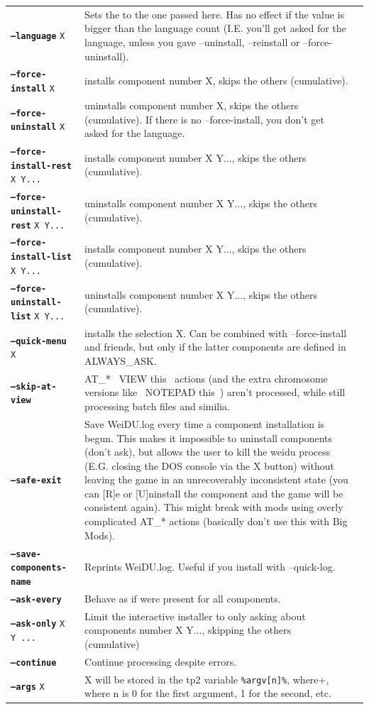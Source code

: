 \documentclass{article}
\def\ttref#1{\ahrefloc{#1}{\tt #1}}
\def\DEFINE#1{{\tt \bf #1}\label{#1}\index{#1}}
\def\t#1{{\tt #1}}
\begin{document}
\begin{tabular}{lp{10in}|p{10in}}
\DEFINE{--language}  \t{X}   & Sets the \ttref{TP2} \ttref{Language} to the one
passed here. Has no effect if the value is bigger than the language count
(I.E. you'll get asked for the language, unless you gave --uninstall, --reinstall
or --force-uninstall). \\
\DEFINE{--force-install} \t{X} & installs component number X, skips the others (cumulative). \\
\DEFINE{--force-uninstall} \t{X} & uninstalls component number X, skips the others (cumulative).
If there is no --force-install, you don't get asked for the language. \\
\DEFINE{--force-install-rest} \t{X Y...} & installs component number X Y...,
skips the others (cumulative). \\
\DEFINE{--force-uninstall-rest} \t{X Y...} & uninstalls component number X Y...,
skips the others (cumulative). \\
\DEFINE{--force-install-list} \t{X Y...} & installs component number X Y...,
skips the others (cumulative). \\
\DEFINE{--force-uninstall-list} \t{X Y...} & uninstalls component number X Y...,
skips the others (cumulative). \\
\DEFINE{--quick-menu} \t{X} & installs the \ttref{QUICK_MENU}
selection X. Can be combined with --force-install and friends, but
only if the latter components are defined in ALWAYS_ASK.  \\
\DEFINE{--skip-at-view} & AT_* ~VIEW this~ actions (and the extra chromosome versions like
~NOTEPAD this~) aren't processed, while still processing batch files and similia. \\
\DEFINE{--safe-exit} & Save WeiDU.log every time a component installation is begun.
This makes it impossible to uninstall components (don't ask), but allows the user to kill
the weidu process (E.G. closing the DOS console via the X button) without leaving the game in an
unrecoverably inconsistent state (you can [R]e or [U]ninstall the component and the game will be
consistent again). This might break with mods using overly complicated AT_* actions (basically
don't use this with Big Mods). \\
\DEFINE{--save-components-name} & Reprints WeiDU.log. Useful if you install with --quick-log. \\
\DEFINE{--ask-every}   & Behave as if \ttref{ASK_EVERY_COMPONENT} were
present for all \ttref{TP2} components. \\
\DEFINE{--ask-only} \t{X Y ...} & Limit the interactive installer to
only asking about components number X Y..., skipping the others
(cumulative) \\
\DEFINE{--continue}     & Continue \ttref{TP2} processing despite
\ttref{TP2 Action} errors. \\
\DEFINE{--args} \t{X}       & X will be stored in the tp2 variable \verb+%argv[n]%+, where
n is 0 for the first argument, 1 for the second, etc.


\end{tabular}
\end{document}
